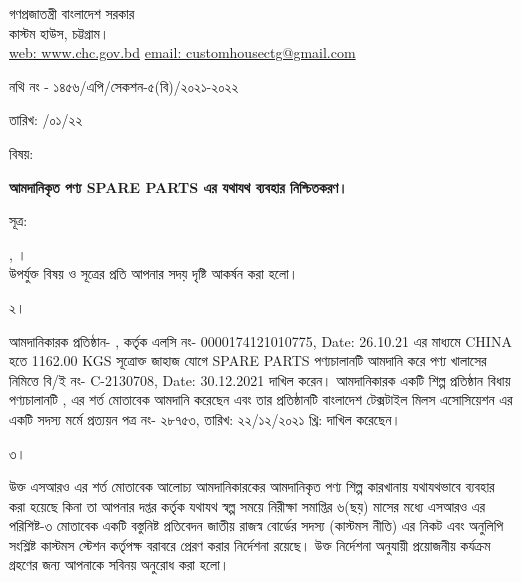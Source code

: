 \documentclass[12pt]{article}
\newcommand{\fileno}{নথি নং - ১৪৫৬/এপি/সেকশন-৫(বি)/২০২১-২০২২}
\newcommand{\fdt}{\hspace*{3em} তারিখ: \hspace{2.4em} /০১/২২}
\newcommand{\beno}{C-2130708}
\newcommand{\bedt}{30.12.2021}
\newcommand{\lcno}{0000174121010775}
\newcommand{\lcdt}{26.10.21}
\newcommand{\good}{SPARE PARTS}
\newcommand{\pkg}{1162.00 KGS}
\newcommand{\co}{CHINA}
\newcommand{\impn}{\jsml}
\newcommand{\impadd}{\jsmla}
\newcommand{\btmaltno}{প্রত্যয়ন পত্র নং- ২৮৭৫৩}
\newcommand{\btmaltnodt}{তারিখ:  ২২/১২/২০২১ খ্রি:}
\begin{document}
\newpage
\begin{center}
\vspace*{6MM}
গণপ্রজাতন্ত্রী বাংলাদেশ সরকার
\\
\footnotesize{কাস্টম হাউস, চট্টগ্রাম।}
\\
\href{}{web: www.chc.gov.bd}\hspace{1em}
\href{}{email: customhousectg@gmail.com}
\end{center}
\begin{minipage}[t]{.70\linewidth}
{\fileno}
\end{minipage}
\begin{minipage}[t]{.30\linewidth}
{\fdt}
\\
\end{minipage}
\begin{minipage}[t]{.07\linewidth}
বিষয়:
\end{minipage}
\begin{minipage}[t]{.93\linewidth}
\textbf{আমদানিকৃত পণ্য {\good} এর যথাযথ ব্যবহার নিশ্চিতকরণ।}
\end{minipage}
\begin{minipage}[t]{.07\linewidth}
সূত্র:
\end{minipage}
\begin{minipage}[t]{.93\linewidth}
{\srootz}, {\srootzd}।
\\
উপর্যুক্ত বিষয় ও সূত্রের প্রতি আপনার সদয় দৃষ্টি
আকর্ষন করা হলো।
\\
\end{minipage}
\begin{minipage}[t]{.07\linewidth}
২।
\end{minipage}
\begin{minipage}[t]{.93\linewidth}
আমদানিকারক প্রতিষ্ঠান- {\impn}, {\impadd}
কর্তৃক এলসি নং- {\lcno}, Date: {\lcdt}
এর মাধ্যমে {\co} হতে
{\pkg} সূত্রোক্ত জাহাজ যোগে {\good}
পণ্যচালানটি আমদানি করে পণ্য
খালাসের নিমিত্তে বি/ই নং- {\beno}, Date: {\bedt}
দাখিল করেন। আমদানিকারক একটি
শিল্প প্রতিষ্ঠান বিধায় পণ্যচালানটি
{\srootz}, {\srootzd}
এর শর্ত মোতাবেক আমদানি করেছেন এবং
তার প্রতিষ্ঠানটি বাংলাদেশ টেক্সটাইল মিলস
এসোসিয়েশন এর একটি সদস্য মর্মে
{\btmaltno}, {\btmaltnodt}
দাখিল করেছেন।
\\
\end{minipage}
\begin{minipage}[t]{.07\linewidth}
৩।
\end{minipage}
\begin{minipage}[t]{.93\linewidth}
উক্ত এসআরও এর শর্ত মোতাবেক
আলোচ্য আমদানিকারকের আমদানিকৃত পণ্য
শিল্প কারখানায় যথাযথভাবে ব্যবহার করা হয়েছে
কিনা তা আপনার দপ্তর কর্তৃক
যথাযথ স্বল্প সময়ে
নিরীক্ষা সমাপ্তির ৬(ছয়) মাসের মধ্যে এসআরও
এর পরিশিষ্ট-৩ মোতাবেক একটি বস্তুনিষ্ট
প্রতিবেদন জাতীয় রাজস্ব বোর্ডের সদস্য
(কাস্টমস নীতি) এর নিকট এবং অনুলিপি সংশ্লিষ্ট
কাস্টমস স্টেশন কর্তৃপক্ষ বরাবরে প্রেরণ করার
নির্দেশনা রয়েছে। উক্ত নির্দেশনা
অনুযায়ী প্রয়োজনীয় কর্যক্রম গ্রহণের জন্য
আপনাকে সবিনয় অনুরোধ করা হলো।
\\
\\
\\
\end{minipage}
\end{document}
